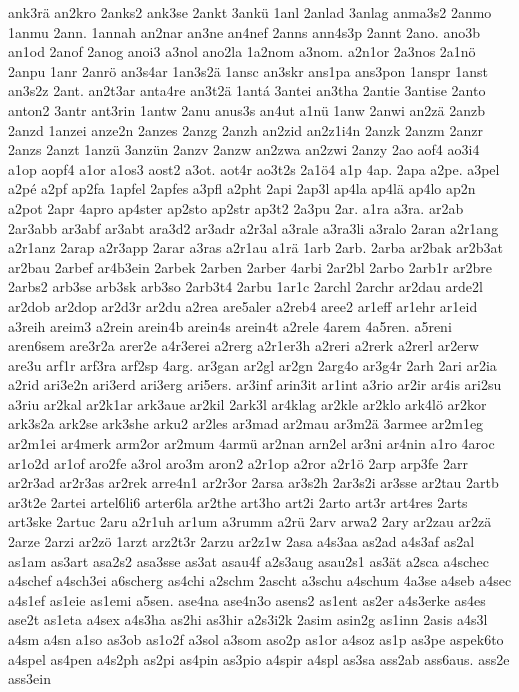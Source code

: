 {ank3rä
an2kro
2anks2
ank3se
2ankt
3ankü
1anl
2anlad
3anlag
anma3s2
2anmo
1anmu
2ann.
1annah
an2nar
an3ne
an4nef
2anns
ann4s3p
2annt
2ano.
ano3b
an1od
2anof
2anog
anoi3
a3nol
ano2la
1a2nom
a3nom.
a2n1or
2a3nos
2a1nö
2anpu
1anr
2anrö
an3s4ar
1an3s2ä
1ansc
an3skr
ans1pa
ans3pon
1anspr
1anst
an3s2z
2ant.
an2t3ar
anta4re
an3t2ä
1antá
3antei
an3tha
2antie
3antise
2anto
anton2
3antr
ant3rin
1antw
2anu
anus3s
an4ut
a1nü
1anw
2anwi
an2zä
2anzb
2anzd
1anzei
anze2n
2anzes
2anzg
2anzh
an2zid
an2z1i4n
2anzk
2anzm
2anzr
2anzs
2anzt
1anzü
3anzün
2anzv
2anzw
an2zwa
an2zwi
2anzy
2ao
aof4
ao3i4
a1op
aopf4
a1or
a1os3
aost2
a3ot.
aot4r
ao3t2s
2a1ö4
a1p
4ap.
2apa
a2pe.
a3pel
a2pé
a2pf
ap2fa
1apfel
2apfes
a3pfl
a2pht
2api
2ap3l
ap4la
ap4lä
ap4lo
ap2n
a2pot
2apr
4apro
ap4ster
ap2sto
ap2str
ap3t2
2a3pu
2ar.
a1ra
a3ra.
ar2ab
2ar3abb
ar3abf
ar3abt
ara3d2
ar3adr
a2r3al
a3rale
a3ra3li
a3ralo
2aran
a2r1ang
a2r1anz
2arap
a2r3app
2arar
a3ras
a2r1au
a1rä
1arb
2arb.
2arba
ar2bak
ar2b3at
ar2bau
2arbef
ar4b3ein
2arbek
2arben
2arber
4arbi
2ar2bl
2arbo
2arb1r
ar2bre
2arbs2
arb3se
arb3sk
arb3so
2arb3t4
2arbu
1ar1c
2archl
2archr
ar2dau
arde2l
ar2dob
ar2dop
ar2d3r
ar2du
a2rea
are5aler
a2reb4
aree2
ar1eff
ar1ehr
ar1eid
a3reih
areim3
a2rein
arein4b
arein4s
arein4t
a2rele
4arem
4a5ren.
a5reni
aren6sem
are3r2a
arer2e
a4r3erei
a2rerg
a2r1er3h
a2reri
a2rerk
a2rerl
ar2erw
are3u
arf1r
arf3ra
arf2sp
4arg.
ar3gan
ar2gl
ar2gn
2arg4o
ar3g4r
2arh
2ari
ar2ia
a2rid
ari3e2n
ari3erd
ari3erg
ari5ers.
ar3inf
arin3it
ar1int
a3rio
ar2ir
ar4is
ari2su
a3riu
ar2kal
ar2k1ar
ark3aue
ar2kil
2ark3l
ar4klag
ar2kle
ar2klo
ark4lö
ar2kor
ark3s2a
ark2se
ark3she
arku2
ar2les
ar3mad
ar2mau
ar3m2ä
3armee
ar2m1eg
ar2m1ei
ar4merk
arm2or
ar2mum
4armü
ar2nan
arn2el
ar3ni
ar4nin
a1ro
4aroc
ar1o2d
ar1of
aro2fe
a3rol
aro3m
aron2
a2r1op
a2ror
a2r1ö
2arp
arp3fe
2arr
ar2r3ad
ar2r3as
ar2rek
arre4n1
ar2r3or
2arsa
ar3s2h
2ar3s2i
ar3sse
ar2tau
2artb
ar3t2e
2artei
artel6li6
arter6la
ar2the
art3ho
art2i
2arto
art3r
art4res
2arts
art3ske
2artuc
2aru
a2r1uh
ar1um
a3rumm
a2rü
2arv
arwa2
2ary
ar2zau
ar2zä
2arze
2arzi
ar2zö
1arzt
arz2t3r
2arzu
ar2z1w
2asa
a4s3aa
as2ad
a4s3af
as2al
as1am
as3art
asa2s2
asa3sse
as3at
asau4f
a2s3aug
asau2s1
as3ät
a2sca
a4schec
a4schef
a4sch3ei
a6scherg
as4chi
a2schm
2ascht
a3schu
a4schum
4a3se
a4seb
a4sec
a4s1ef
as1eie
as1emi
a5sen.
ase4na
ase4n3o
asens2
as1ent
as2er
a4s3erke
as4es
ase2t
as1eta
a4sex
a4s3ha
as2hi
as3hir
a2s3i2k
2asim
asin2g
as1inn
2asis
a4s3l
a4sm
a4sn
a1so
as3ob
as1o2f
a3sol
a3som
aso2p
as1or
a4soz
as1p
as3pe
aspek6to
a4spel
as4pen
a4s2ph
as2pi
as4pin
as3pio
a4spir
a4spl
as3sa
ass2ab
ass6aus.
ass2e
ass3ein
}
